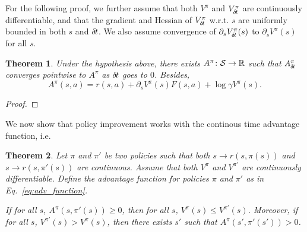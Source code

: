 \documentclass[11pt]{article}
\newtheorem{theorem}{Theorem}
\begin{document}
For the following proof, we further assume that both $V^\pi$ and
$V^\pi_{\delta\hspace{-.1em}t}$ are continuously differentiable, and that the gradient and
Hessian of $V^\pi_{\delta\hspace{-.1em}t}$ w.r.t. $s$ are uniformly bounded in both $s$ and ${\delta\hspace{-.1em}t}$.
We also assume convergence of $\partial_s V^\pi_{\delta\hspace{-.1em}t}(s)$ to $\partial_s V^\pi(s)$ for
all $s$.

\begin{theorem}
	Under the hypothesis above, there exists $A^\pi\colon {\cal S} \rightarrow
	\mathbb{R}$ such that $A^\pi_{\delta\hspace{-.1em}t}$ converges pointwise to $A^\pi$ as
	${\delta\hspace{-.1em}t}$ goes to $0$. Besides,
	\begin{equation}
		A^\pi(s, a) = r(s, a) + \partial_s V^\pi(s) F(s, a) + \log \gamma V^\pi(s).
	\end{equation}\end{theorem}
\begin{proof}
	
\end{proof}

We now show that policy improvement works with the continous time advantage function, i.e.\
\begin{theorem}
\label{thm:policyimprovement}
	Let $\pi$ and $\pi'$ be two policies such that both $s \rightarrow r(s, \pi(s))$ and
	$s \rightarrow r(s, \pi'(s))$ are continuous.
	Assume that both $V^\pi$ and $V^{\pi'}$ are continuously differentiable.
	Define the advantage function for policies $\pi$ and $\pi'$ as in Eq.~\eqref{eq:adv_function}.

	If for all $s$, $A^\pi(s, \pi'(s)) \geq 0$, then for all $s$,
	$V^\pi(s) \leq V^{\pi'}(s)$. Moreover, if for all $s$, 
	$V^{\pi'}(s)>V^{\pi}(s)$, then there exists $s'$ such that $A^\pi(s',\pi'(s'))>0$.
\end{theorem}
\end{document}
